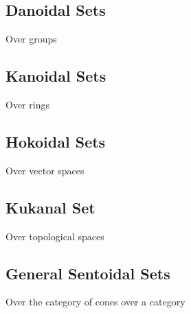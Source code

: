 \subsection{Danoidal Sets}
Over groups

\subsection{Kanoidal Sets}
Over rings 

\subsection{Hokoidal Sets}
Over vector spaces

\subsection{Kukanal Set}
Over topological spaces

\subsection{General Sentoidal Sets}
Over the category of cones over a category
